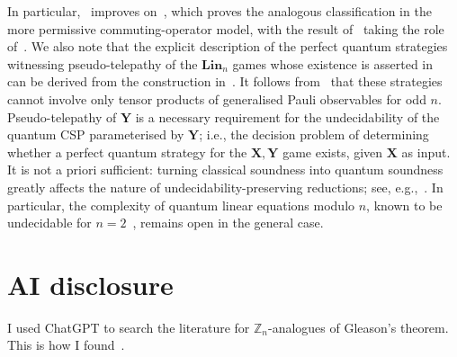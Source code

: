 \documentclass[11pt]{article}
\newcommand{\Z}{\mathbb Z}
\newcommand{\X}{\mathbf X}
\newcommand{\Y}{\mathbf Y}
\newcommand{\Lin}{\mathbf{Lin}}
\theoremstyle{plain}
\theoremstyle{definition}
\theoremstyle{remark}
\begin{document}
In particular,~ improves on~\cite[Theorem~1]{bulatov2025satisfiability}, which proves the analogous classification in the more permissive commuting-operator model, with the result of~\cite{slofstra2024operator} taking the role of~. 
We also note that the explicit description of the perfect quantum strategies witnessing pseudo-telepathy of the $\Lin_n$ games whose existence is asserted in~ can be derived from the construction in~\cite{harding2005group}. It follows from~\cite{qassim2020classical} that these strategies cannot involve only tensor products of generalised Pauli observables for odd $n$.  
%
Pseudo-telepathy of $\Y$ is a necessary requirement for the undecidability of the quantum CSP parameterised by $\Y$; i.e., the decision problem of determining whether a perfect quantum strategy for the $\X,\Y$ game exists, given $\X$ as input. It is not a priori sufficient: turning classical soundness into quantum soundness greatly affects the nature of undecidability-preserving reductions; see, e.g.,~\cite{Ji,culf2024re,paddock2025satisfiability,CJM2025quantum,culf2026quantum,ji2021mip}. In particular, the complexity of quantum linear equations modulo $n$, known to be undecidable for $n=2$~\cite{slofstra2019set}, remains open in the general case. 

\section*{AI disclosure}
I used ChatGPT to search the literature for $\Z_n$-analogues of Gleason's theorem. This is how I found~\cite{harding2005group}. 

\printbibliography
\end{document}
